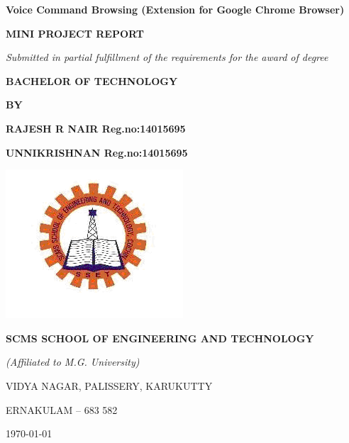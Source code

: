 \documentclass[11pt]{report} %
\begin{document}
	
	\thispagestyle{empty}
	\begin{center}
		\begin{minipage}{\linewidth}
			\centering
			\vspace{2cm}
			{\Huge \bf{Voice Command Browsing (Extension for Google Chrome  Browser)}\par}
			\vspace{1cm}
			{\Large \bfseries{MINI PROJECT REPORT}\par}
			\vspace{0.5cm}
			{\Large \emph{Submitted in partial fulfillment of the requirements for the award of degree}\par}
			\vspace{0.5cm}
			{\Large \bf{BACHELOR OF TECHNOLOGY} \par}
			\vspace{0.5cm}
			{\Large \bf{BY} \par}
			\vspace{1cm}
			{\Large \bf{RAJESH R NAIR}\hspace{3cm}     Reg.no:14015695 \par}
			{\Large \bf{UNNIKRISHNAN}\hspace{3cm}      Reg.no:14015695 \par}
			\vspace{1cm}
			\includegraphics[width=0.5\linewidth]{figures/logo.png}
			
			{\Large \bfseries{SCMS SCHOOL OF ENGINEERING AND TECHNOLOGY}\par}
			{\Large \emph{(Affiliated to M.G. University)}\par}
			{\Large VIDYA NAGAR, PALISSERY, KARUKUTTY\par}
			{\Large ERNAKULAM – 683 582\par}
			\vspace{1cm}
			
			
			{\Large \monthyeardate \today}
		\end{minipage}
	\end{center}
	\clearpage
	
\end{document}
